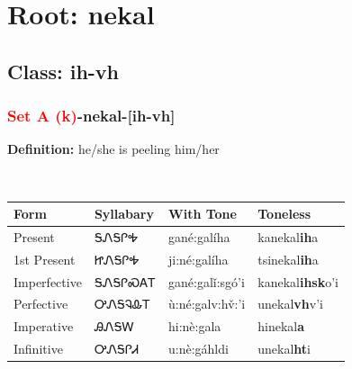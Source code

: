 \needspace{4in}
\section*{Root: nekal}
\nopagebreak
{}
\needspace{3in}
\subsection*{Class: ih-vh}
\nopagebreak
\needspace{2in}
\subsubsection*{\textcolor{Red}{Set A (k)}{-}\textbf{nekal}{-}[ih-vh]}
\nopagebreak
\textbf{Definition: } he/she is peeling him/her
\\[0.5em]
\begin{tabularx}{\textwidth}{l X X X}%
\toprule%
\textbf{Form}&\textbf{Syllabary}&\textbf{With Tone}&\textbf{Toneless}\\%
\midrule%
Present&ᎦᏁᎦᎵᎭ&gané:galíha&kanekal\textbf{ih}a\\%
1st Present&ᏥᏁᎦᎵᎭ&ji:né:galíha&tsinekal\textbf{ih}a\\%
Imperfective&ᎦᏁᎦᎵᏍᎪᎢ&gané:galǐ:sgó’i&kanekal\textbf{ihsk}o'i\\%
Perfective&ᎤᏁᎦᎸᎲᎢ&ù:né:galv:hv̌:’i&unekal\textbf{vh}v'i\\%
Imperative&ᎯᏁᎦᎳ&hi:nè:gala&hinekal\textbf{a}\\%
Infinitive&ᎤᏁᎦᎵᏗ&u:nè:gáhldi&unekal\textbf{ht}i\\%
\bottomrule%
\end{tabularx}
\\[1em]